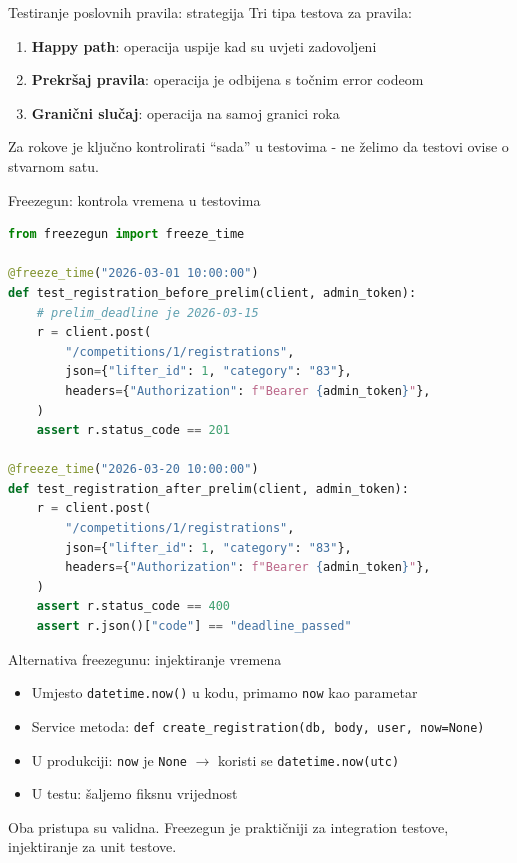 \begin{frame}{Testiranje poslovnih pravila: strategija}
Tri tipa testova za pravila:
\begin{enumerate}
  \item \textbf{Happy path}: operacija uspije kad su uvjeti zadovoljeni
  \item \textbf{Prekršaj pravila}: operacija je odbijena s točnim error codeom
  \item \textbf{Granični slučaj}: operacija na samoj granici roka
\end{enumerate}

\vspace{0.6em}
Za rokove je ključno kontrolirati \enquote{sada} u testovima - ne želimo da testovi ovise o stvarnom satu.
\end{frame}

\begin{frame}[fragile,shrink=5]{Freezegun: kontrola vremena u testovima}
\begin{lstlisting}[language=python]
from freezegun import freeze_time

@freeze_time("2026-03-01 10:00:00")
def test_registration_before_prelim(client, admin_token):
    # prelim_deadline je 2026-03-15
    r = client.post(
        "/competitions/1/registrations",
        json={"lifter_id": 1, "category": "83"},
        headers={"Authorization": f"Bearer {admin_token}"},
    )
    assert r.status_code == 201

@freeze_time("2026-03-20 10:00:00")
def test_registration_after_prelim(client, admin_token):
    r = client.post(
        "/competitions/1/registrations",
        json={"lifter_id": 1, "category": "83"},
        headers={"Authorization": f"Bearer {admin_token}"},
    )
    assert r.status_code == 400
    assert r.json()["code"] == "deadline_passed"
\end{lstlisting}
\end{frame}

\begin{frame}{Alternativa freezegunu: injektiranje vremena}
\begin{itemize}
  \item Umjesto \texttt{datetime.now()} u kodu, primamo \texttt{now} kao parametar
  \item Service metoda: \texttt{def create\_registration(db, body, user, now=None)}
  \item U produkciji: \texttt{now} je \texttt{None} $\rightarrow$ koristi se \texttt{datetime.now(utc)}
  \item U testu: šaljemo fiksnu vrijednost
\end{itemize}

\vspace{0.6em}
Oba pristupa su validna. Freezegun je praktičniji za integration testove, injektiranje za unit testove.
\end{frame}

